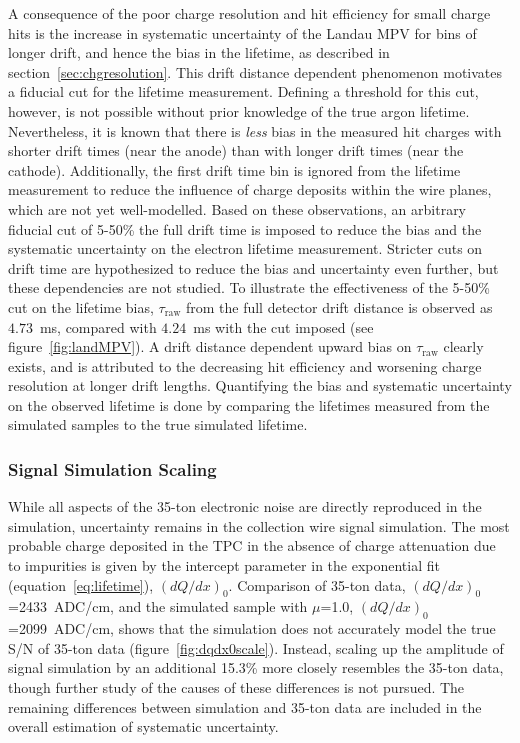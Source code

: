 \documentclass[10pt,a4paper]{article}
\begin{document}
A consequence of the poor charge resolution and hit efficiency for small charge hits is the increase in systematic uncertainty of the Landau MPV for bins of longer drift, and hence the bias in the lifetime, as described in section~\ref{sec:chgresolution}. This drift distance dependent phenomenon motivates a fiducial cut for the lifetime measurement. Defining a threshold for this cut, however, is not possible without prior knowledge of the true argon lifetime. Nevertheless, it is known that there is \emph{less} bias in the measured hit charges with shorter drift times (near the anode) than with longer drift times (near the cathode). Additionally, the first drift time bin is ignored from the lifetime measurement to reduce the influence of charge deposits within the wire planes, which are not yet well-modelled. Based on these observations, an arbitrary fiducial cut of 5-50\% the full drift time is imposed to reduce the bias and the systematic uncertainty on the electron lifetime measurement. Stricter cuts on drift time are hypothesized to reduce the bias and uncertainty even further, but these dependencies are not studied. To illustrate the effectiveness of the 5-50\% cut on the lifetime bias, $\tau_{\text{raw}}$ from the full detector drift distance is observed as $4.73$~ms, compared with $4.24$~ms with the cut imposed (see figure~\ref{fig:landMPV}). A drift distance dependent upward bias on $\tau_{\text{raw}}$ clearly exists, and is attributed to the decreasing hit efficiency and worsening charge resolution at longer drift lengths. Quantifying the bias and systematic uncertainty on the observed lifetime is done by comparing the lifetimes measured from the simulated samples to the true simulated lifetime.

\subsubsection{Signal Simulation Scaling}\label{sec:chanscale}

While all aspects of the 35-ton electronic noise are directly reproduced in the simulation, uncertainty remains in the collection wire signal simulation. The most probable charge deposited in the TPC in the absence of charge attenuation due to impurities is given by the intercept parameter in the exponential fit (equation~\ref{eq:lifetime}), $(dQ/dx)_0$. Comparison of 35-ton data, $(dQ/dx)_0$=2433~ADC/cm, and the simulated sample with $\mu$=1.0, $(dQ/dx)_0$=2099~ADC/cm, shows that the simulation does not accurately model the true S/N of 35-ton data (figure~\ref{fig:dqdx0scale}). Instead, scaling up the amplitude of signal simulation by an additional 15.3\% more closely resembles the 35-ton data, though further study of the causes of these differences is not pursued. The remaining differences between simulation and 35-ton data are included in the overall estimation of systematic uncertainty.
\end{document}
